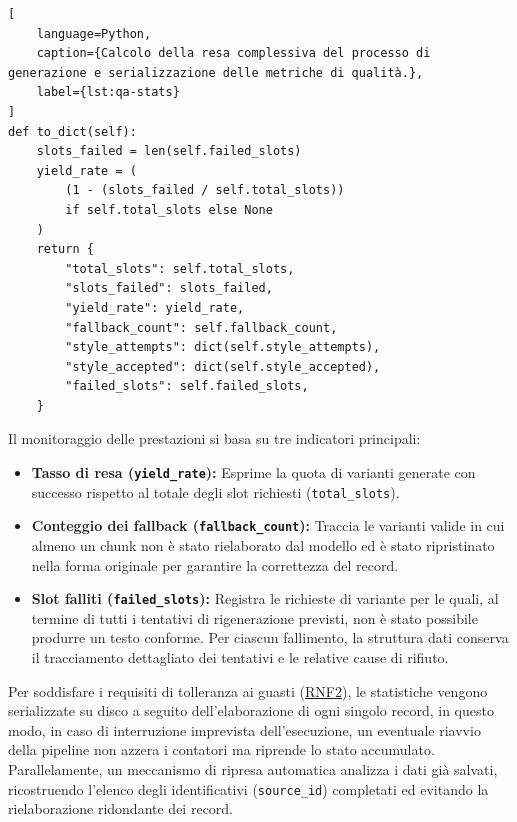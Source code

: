 \documentclass[12pt,a4paper,openright,twoside]{book}
\begin{document}
\begin{lstlisting}[
    language=Python,
    caption={Calcolo della resa complessiva del processo di generazione e serializzazione delle metriche di qualità.},
    label={lst:qa-stats}
]
def to_dict(self):
    slots_failed = len(self.failed_slots)
    yield_rate = (
        (1 - (slots_failed / self.total_slots)) 
        if self.total_slots else None
    )
    return {
        "total_slots": self.total_slots,
        "slots_failed": slots_failed,
        "yield_rate": yield_rate,
        "fallback_count": self.fallback_count,
        "style_attempts": dict(self.style_attempts),
        "style_accepted": dict(self.style_accepted),
        "failed_slots": self.failed_slots,
    }
\end{lstlisting}

Il monitoraggio delle prestazioni si basa su tre indicatori principali:

\begin{itemize}
    \item \textbf{Tasso di resa (\texttt{yield\_rate}):} Esprime la quota di
          varianti generate con successo rispetto al totale degli slot richiesti
          (\texttt{total\_slots}).
    \item \textbf{Conteggio dei fallback (\texttt{fallback\_count}):} Traccia le
          varianti valide in cui almeno un chunk non è stato rielaborato dal
          modello ed è stato ripristinato nella forma originale per garantire la
          correttezza del record.
    \item \textbf{Slot falliti (\texttt{failed\_slots}):} Registra le richieste
          di variante per le quali, al termine di tutti i tentativi di
          rigenerazione previsti, non è stato possibile produrre un testo
          conforme. Per ciascun fallimento, la struttura dati conserva il
          tracciamento dettagliato dei tentativi e le relative cause di rifiuto.
\end{itemize}

Per soddisfare i requisiti di tolleranza ai guasti (\hyperref[rnf:RNF2]{RNF2}),
le statistiche vengono serializzate su disco a seguito dell'elaborazione di ogni
singolo record, in questo modo, in caso di interruzione imprevista
dell'esecuzione, un eventuale riavvio della pipeline non azzera i contatori ma
riprende lo stato accumulato. Parallelamente, un meccanismo di ripresa
automatica analizza i dati già salvati, ricostruendo l'elenco degli
identificativi (\texttt{source\_id}) completati ed evitando la rielaborazione
ridondante dei record.
\end{document}

